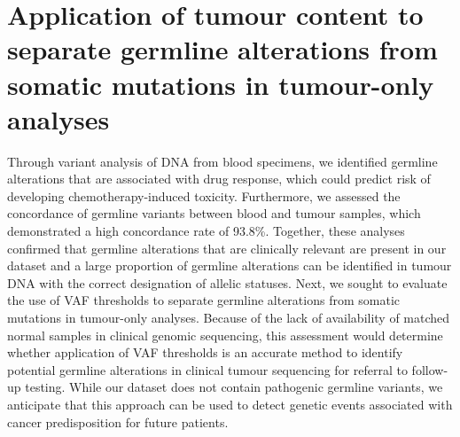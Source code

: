 \section{Application of tumour content to separate germline alterations from somatic mutations in tumour-only analyses}
\label{sec:Applicationoftumourcontenttoseparategermlinealterationsfromsomaticmutationsintumour-onlyanalyses}

Through variant analysis of DNA from blood specimens, we identified germline alterations that are associated with drug response, which could predict risk of developing chemotherapy-induced toxicity. Furthermore, we assessed the concordance of germline variants between blood and tumour samples, which demonstrated a high concordance rate of 93.8\%. Together, these analyses confirmed that germline alterations that are clinically relevant are present in our dataset and a large proportion of germline alterations can be identified in tumour DNA with the correct designation of allelic statuses. Next, we sought to evaluate the use of VAF thresholds to separate germline alterations from somatic mutations in tumour-only analyses. Because of the lack of availability of matched normal samples in clinical genomic sequencing, this assessment would determine whether application of VAF thresholds is an accurate method to identify potential germline alterations in clinical tumour sequencing for referral to follow-up testing. While our dataset does not contain pathogenic germline variants, we anticipate that this approach can be used to detect genetic events associated with cancer predisposition for future patients.

